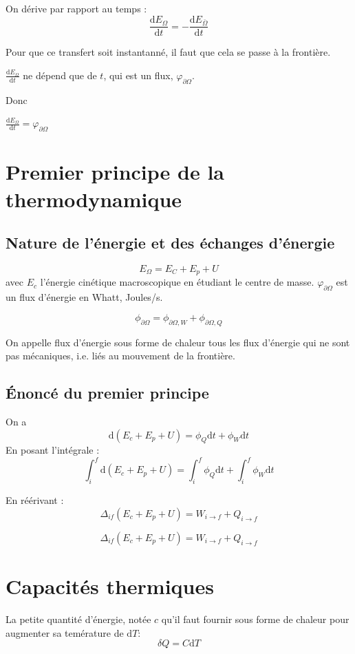 \documentclass[french]{yLectureNote}
\newcommand{\dd}[0]{\mathrm{d}}
\begin{document}
On dérive par rapport au temps :
$$\frac{\dd E_{\Omega}}{\dd t}= -\frac{\dd E_{\bar{\Omega}}}{\dd t}$$

Pour que ce transfert soit instantanné, il faut que cela se passe à la frontière.

$\frac{\dd E_{\Omega}}{\dd t}$ ne dépend que de $t$, qui est un flux, $\varphi_{\partial \Omega}$.

Donc 
\begin{theorem}
    $\frac{\dd E_{\Omega}}{\dd t} = \varphi_{\partial \Omega}$
\end{theorem}
\section{Premier principe de la thermodynamique}
\subsection{Nature de l'énergie et des échanges d'énergie}
$$E_{\Omega} = E_{C} + E_p + U$$ avec $E_c$ l'énergie cinétique macroscopique en étudiant le centre de masse.
$\varphi_{\partial \Omega}$ est un flux d'énergie en Whatt, Joules/s.

$$\phi_{\partial \Omega} = \phi_{\partial \Omega, W} + \phi_{\partial \Omega, Q}$$
\begin{definition}
    On appelle flux d'énergie sous forme de chaleur tous les flux d'énergie qui ne
    sont pas mécaniques, i.e. liés au mouvement de la frontière.
\end{definition}
\subsection{Énoncé du premier principe}
On a $$\dd (E_c+E_p+U) = \phi_Q\dd t+\phi_W \dd t$$
En posant l'intégrale :
$$\int_i^f \dd (E_c+E_p+U) = \int_i^f \phi_Q\dd t+ \int_i^f\phi_W \dd t$$

En réérivant :
$$\Delta_{if} (E_c+E_p+U) = W_{i \to f} + Q_{i\to f}$$

\begin{theorem}
    $$\Delta_{if} (E_c+E_p+U) = W_{i \to f} + Q_{i\to f}$$
\end{theorem}
\section{Capacités thermiques}
\begin{definition}
    La petite quantité d'énergie, notée $c$ qu'il faut fournir sous forme de chaleur pour augmenter sa temérature de $\dd T$:
    $$\delta Q = C\dd T$$
\end{definition}
\end{document}
